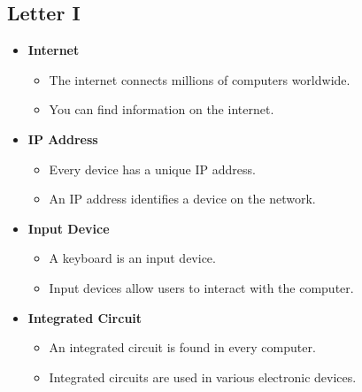     \subsection{Letter I}
    \begin{itemize}
        \item \textbf{Internet}
        \begin{itemize}
            \item The internet connects millions of computers worldwide.
            \item You can find information on the internet.
        \end{itemize}
        \item \textbf{IP Address}
        \begin{itemize}
            \item Every device has a unique IP address.
            \item An IP address identifies a device on the network.
        \end{itemize}
        \item \textbf{Input Device}
        \begin{itemize}
            \item A keyboard is an input device.
            \item Input devices allow users to interact with the computer.
        \end{itemize}
        \item \textbf{Integrated Circuit}
        \begin{itemize}
            \item An integrated circuit is found in every computer.
            \item Integrated circuits are used in various electronic devices.
        \end{itemize}
    \end{itemize}

